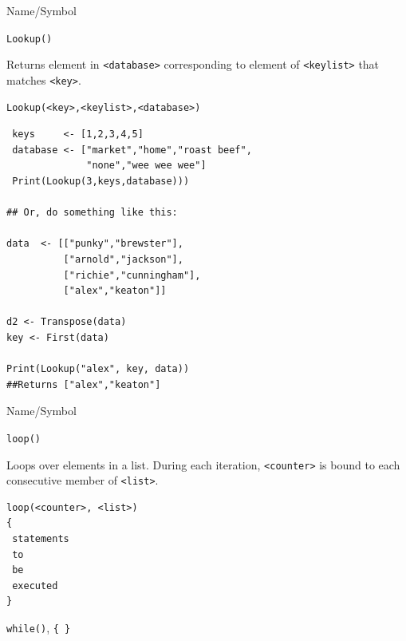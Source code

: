 \begin{desc}{Name/Symbol}
\item[Name/Symbol]	\verb+Lookup()+

\item[Description] Returns
element in \verb+<database>+ corresponding to element of
\verb+<keylist>+ that matches \verb+<key>+.

\item[Usage]		
\begin{verbatim}
Lookup(<key>,<keylist>,<database>)
\end{verbatim}

\item[Example]	

\begin{verbatim}
 keys     <- [1,2,3,4,5]
 database <- ["market","home","roast beef",
              "none","wee wee wee"]
 Print(Lookup(3,keys,database))) 

## Or, do something like this:
  
data  <- [["punky","brewster"],
          ["arnold","jackson"],
          ["richie","cunningham"],
          ["alex","keaton"]]

d2 <- Transpose(data)
key <- First(data)

Print(Lookup("alex", key, data))
##Returns ["alex","keaton"]
\end{verbatim}
\item[See Also]	
\end{desc}

\begin{desc}{Name/Symbol}
\item[Name/Symbol]	\verb+loop()+

\item[Description]	Loops over elements in a list.  During each iteration, \verb+<counter>+ is bound to each consecutive member of \verb+<list>+.

\item[Usage]		
\begin{verbatim}
loop(<counter>, <list>)
{
 statements
 to
 be	   
 executed
}
\end{verbatim}

\item[Example]	

\item[See Also]	\verb+while()+, \verb+{ }+
\end{desc}

\vfill
\newpage
{}
\vfill


